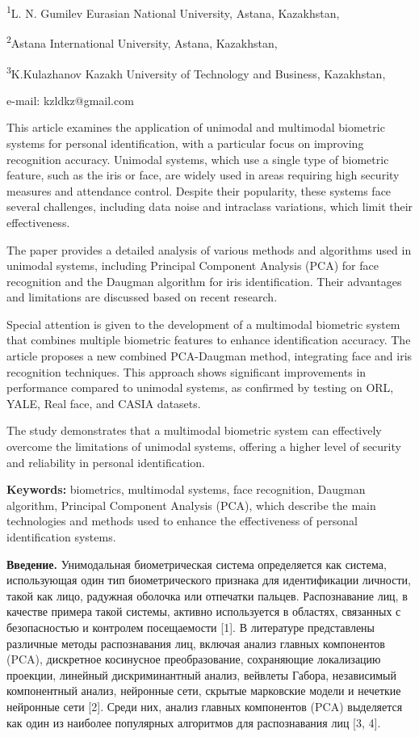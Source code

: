 \textsuperscript{1}L. N. Gumilev Eurasian National University, Astana,
Kazakhstan,

\textsuperscript{2}Astana International University, Astana, Kazakhstan,

\textsuperscript{3}K.Kulazhanov Kazakh University of Technology and
Business, Kazakhstan,

e-mail: kzldkz@gmail.com

This article examines the application of unimodal and multimodal
biometric systems for personal identification, with a particular focus
on improving recognition accuracy. Unimodal systems, which use a single
type of biometric feature, such as the iris or face, are widely used in
areas requiring high security measures and attendance control. Despite
their popularity, these systems face several challenges, including data
noise and intraclass variations, which limit their effectiveness.

The paper provides a detailed analysis of various methods and algorithms
used in unimodal systems, including Principal Component Analysis (PCA)
for face recognition and the Daugman algorithm for iris identification.
Their advantages and limitations are discussed based on recent research.

Special attention is given to the development of a multimodal biometric
system that combines multiple biometric features to enhance
identification accuracy. The article proposes a new combined PCA-Daugman
method, integrating face and iris recognition techniques. This approach
shows significant improvements in performance compared to unimodal
systems, as confirmed by testing on ORL, YALE, Real face, and CASIA
datasets.

The study demonstrates that a multimodal biometric system can
effectively overcome the limitations of unimodal systems, offering a
higher level of security and reliability in personal identification.

\textbf{Keywords:} biometrics, multimodal systems, face recognition,
Daugman algorithm, Principal Component Analysis (PCA), which describe
the main technologies and methods used to enhance the effectiveness of
personal identification systems.

\textbf{Введение.} Унимодальная биометрическая система определяется как
система, использующая один тип биометрического признака для
идентификации личности, такой как лицо, радужная оболочка или отпечатки
пальцев. Распознавание лиц, в качестве примера такой системы, активно
используется в областях, связанных с безопасностью и контролем
посещаемости {[}1{]}. В литературе представлены различные методы
распознавания лиц, включая анализ главных компонентов (PCA), дискретное
косинусное преобразование, сохраняющие локализацию проекции, линейный
дискриминантный анализ, вейвлеты Габора, независимый компонентный
анализ, нейронные сети, скрытые марковские модели и нечеткие нейронные
сети {[}2{]}. Среди них, анализ главных компонентов (PCA) выделяется как
один из наиболее популярных алгоритмов для распознавания лиц {[}3, 4{]}.

